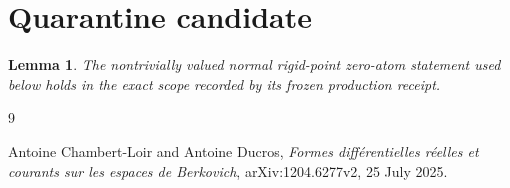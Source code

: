 \documentclass[11pt]{article}
\newtheorem{lemma}{Lemma}
\begin{document}
\section*{Quarantine candidate}



\begin{lemma}
\label{lem:p21p3-componentwise-normal-rigid-zero-atom}
The nontrivially valued normal rigid-point zero-atom statement used below
holds in the exact scope recorded by its frozen production receipt.
\end{lemma}



\begin{sloppypar}
\begin{thebibliography}{9}
\raggedright

Antoine Chambert-Loir and Antoine Ducros,
\emph{Formes diff\'erentielles r\'eelles et courants sur les espaces de
Berkovich}, arXiv:1204.6277v2, 25 July 2025.

\end{thebibliography}
\end{sloppypar}
\end{document}
